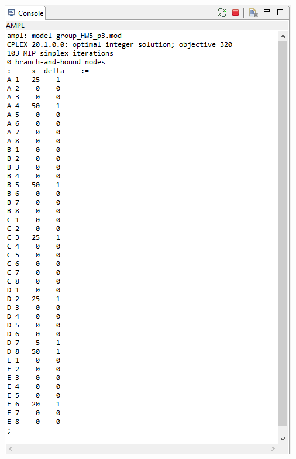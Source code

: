 \documentclass[11pt]{article}
\begin{document}
\begin{enumerate}
\includegraphics[width = .9\textwidth]{outputp3.png}


\end{enumerate}
\end{document}
